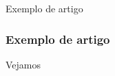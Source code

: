 \begin{frame}[standout]
  \Huge
  Exemplo de artigo
\end{frame}

\begin{frame}
  \frametitle{Exemplo de artigo}
  \Huge
  Vejamos 
\end{frame}
